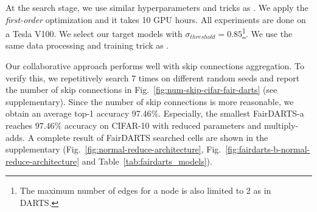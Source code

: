 \documentclass[runningheads]{llncs}
\begin{document}
At the search stage, we use similar hyperparameters and tricks as \cite{liu2018darts}. We apply the \emph{first-order} optimization and it takes 10 GPU hours. All experiments are done on a Tesla V100.
We select our target models with $\sigma_{threshold} = 0.85$\footnote{The maximum number of edges for a node is also limited to 2 as in DARTS.}. We use the same data processing and training trick as \cite{liu2018darts,chen2019progressive}. 

Our collaborative approach performs well with skip connections aggregation. To verify this, we repetitively search 7 times on different random seeds and report the number of skip connections in Fig.~\ref{fig:num-skip-cifar-fair-darts} (see supplementary). Since the number of skip connections is more reasonable, we obtain an average top-1 accuracy 97.46$\%$. Especially, the smallest FairDARTS-a reaches $97.46\%$ accuracy on CIFAR-10 with reduced parameters and multiply-adds. A complete result of FairDARTS searched cells are shown in the supplementary (Fig.~\ref{fig:normal-reduce-architecture}, Fig.~\ref{fig:fairdarts-b-normal-reduce-architecture} and Table~\ref{tab:fairdarts_models}). 
\end{document}
